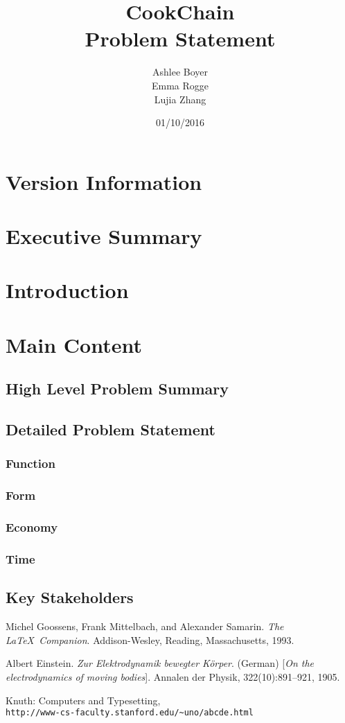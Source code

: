 \documentclass{article}
\title{CookChain \\ Problem Statement}
\author{Ashlee Boyer \\Emma Rogge \\ Lujia Zhang}
\date{01/10/2016}
\begin{document}
\renewcommand*\contentsname{Table of Contents} 
\maketitle
 
\tableofcontents

\section{Version Information}
\section{Executive Summary}
\section{Introduction}
\section{Main Content}
\subsection{High Level Problem Summary}
\subsection{Detailed Problem Statement}
\subsubsection{Function}
\subsubsection{Form}
\subsubsection{Economy}
\subsubsection{Time}
\subsection{Key Stakeholders}
 
\begin{thebibliography}{9}
Michel Goossens, Frank Mittelbach, and Alexander Samarin. 
\textit{The \LaTeX\ Companion}. 
Addison-Wesley, Reading, Massachusetts, 1993.
 
Albert Einstein. 
\textit{Zur Elektrodynamik bewegter K{\"o}rper}. (German) 
[\textit{On the electrodynamics of moving bodies}]. 
Annalen der Physik, 322(10):891–921, 1905.
 
Knuth: Computers and Typesetting,
\\\texttt{http://www-cs-faculty.stanford.edu/\~{}uno/abcde.html}
\end{thebibliography}
 

 
\end{document}
